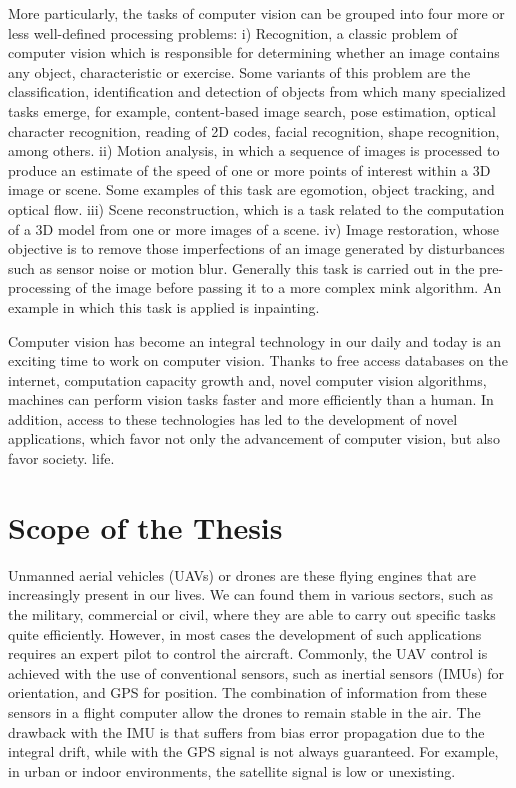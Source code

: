 More particularly, the tasks of computer vision can be grouped into four more or less well-defined processing problems: i) Recognition, a classic problem of computer vision which is responsible for determining whether an image contains any object, characteristic or exercise. Some variants of this problem are the classification, identification and detection of objects from which many specialized tasks emerge, for example, content-based image search, pose estimation, optical character recognition, reading of 2D codes, facial recognition, shape recognition, among others.
ii) Motion analysis, in which a sequence of images is processed to produce an estimate of the speed of one or more points of interest within a 3D image or scene. Some examples of this task are egomotion, object tracking, and optical flow.
iii) Scene reconstruction, which is a task related to the computation of a 3D model from one or more images of a scene.
iv) Image restoration, whose objective is to remove those imperfections of an image generated by disturbances such as sensor noise or motion blur. Generally this task is carried out in the pre-processing of the image before passing it to a more complex mink algorithm. An example in which this task is applied is inpainting.

Computer vision has become an integral technology in our daily and today is an exciting time to work on computer vision. Thanks to free access databases on the internet, computation capacity growth and, novel computer vision algorithms, machines can perform vision tasks faster and more efficiently than a human. In addition, access to these technologies has led to the development of novel applications, which favor not only the advancement of computer vision, but also favor society.  life.

\section{Scope of the Thesis}

Unmanned aerial vehicles (UAVs) or drones are these flying engines that are increasingly present in our lives. We can found them in various sectors, such as the military, commercial or civil, where they are able to carry out specific tasks quite efficiently. However, in most cases the development of such applications requires an expert pilot to control the aircraft. Commonly, the UAV  control is achieved with the use of conventional sensors, such as inertial sensors (IMUs) for orientation, and GPS for position. The combination of information from these sensors in a flight computer allow the drones to remain stable in the air. The drawback with the IMU is that suffers from bias error propagation due to the integral drift, while with the GPS signal is not always guaranteed. For example, in urban or indoor environments, the satellite signal is low or unexisting. 

